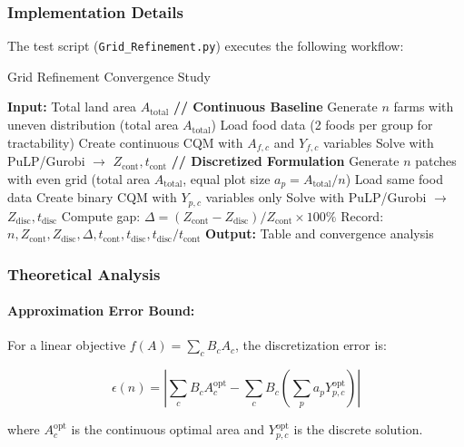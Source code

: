 \documentclass{article}
\begin{document}
\subsubsection{Implementation Details}

The test script (\texttt{Grid\_Refinement.py}) executes the following workflow:

\begin{algorithm}[H]
\caption{Grid Refinement Convergence Study}
\begin{algorithmic}[1]
\State \textbf{Input:} Total land area $A_{\text{total}}$
    \State \textbf{// Continuous Baseline}
    \State Generate $n$ farms with uneven distribution (total area $A_{\text{total}}$)
    \State Load food data (2 foods per group for tractability)
    \State Create continuous CQM with $A_{f,c}$ and $Y_{f,c}$ variables
    \State Solve with PuLP/Gurobi $\to$ $Z_{\text{cont}}, t_{\text{cont}}$
    \State
    \State \textbf{// Discretized Formulation}
    \State Generate $n$ patches with even grid (total area $A_{\text{total}}$, equal plot size $a_p = A_{\text{total}}/n$)
    \State Load same food data
    \State Create binary CQM with $Y_{p,c}$ variables only
    \State Solve with PuLP/Gurobi $\to$ $Z_{\text{disc}}, t_{\text{disc}}$
    \State
    \State Compute gap: $\Delta = (Z_{\text{cont}} - Z_{\text{disc}})/Z_{\text{cont}} \times 100\%$
    \State Record: $n, Z_{\text{cont}}, Z_{\text{disc}}, \Delta, t_{\text{cont}}, t_{\text{disc}}, t_{\text{disc}}/t_{\text{cont}}$
\EndFor
\State \textbf{Output:} Table and convergence analysis
\end{algorithmic}
\end{algorithm}

\subsubsection{Theoretical Analysis}

\paragraph{Approximation Error Bound:}

For a linear objective $f(A) = \sum_c B_c A_c$, the discretization error is:

$$\epsilon(n) = \left| \sum_c B_c A_c^{\text{opt}} - \sum_c B_c \left(\sum_p a_p Y_{p,c}^{\text{opt}}\right) \right|$$

where $A_c^{\text{opt}}$ is the continuous optimal area and $Y_{p,c}^{\text{opt}}$ is the discrete solution.
\end{document}
